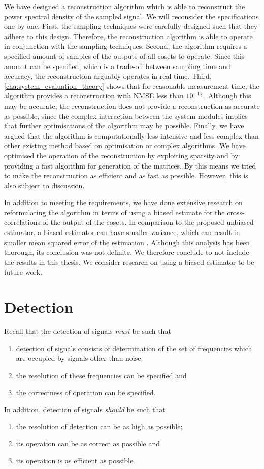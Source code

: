 \documentclass[a4paper, openany, oneside]{memoir}
\begin{document}
We have designed a reconstruction algorithm which is able to reconstruct the power spectral density of the sampled signal. We will reconsider the specifications one by one. First, the sampling techniques were carefully designed such that they adhere to this design. Therefore, the reconstruction algorithm is able to operate in conjunction with the sampling techniques. Second, the algorithm requires a specified amount of samples of the outputs of all cosets to operate. Since this amount can be specified, which is a trade-off between sampling time and accuracy, the reconstruction arguably operates in real-time. Third, \cref{cha:system_evaluation_theory} shows that for reasonable measurement time, the algorithm provides a reconstruction with NMSE less than $10^{-1.5}$. Although this may be accurate, the reconstruction does not provide a reconstruction as accurate as possible, since the complex interaction between the system modules implies that further optimisations of the algorithm may be possible. Finally, we have argued that the algorithm is computationally less intensive and less complex than other existing method based on optimisation or complex algorithms. We have optimised the operation of the reconstruction by exploiting sparsity and by providing a fast algorithm for generation of the matrices. By this means we tried to make the reconstruction as efficient and as fast as possible. However, this is also subject to discussion.

In addition to meeting the requirements, we have done extensive research on reformulating the algorithm in terms of using a biased estimate for the cross-correlations of the output of the cosets. In comparison to the proposed unbiased estimator, a biased estimator can have smaller variance, which can result in smaller mean squared error of the estimation \cite{hayes1996statistical}. Although this analysis has been thorough, its conclusion was not definite. We therefore conclude to not include the results in this thesis. We consider research on using a biased estimator to be future work.

\section{Detection}
Recall that the detection of signals \emph{must} be such that
\begin{enumerate}
    \item detection of signals consists of determination of the set of frequencies which are occupied by signals other than noise;
    \item the resolution of these frequencies can be specified and
    \item the correctness of operation can be specified.
\end{enumerate}
In addition, detection of signals \emph{should} be such that
\begin{enumerate}
    \item the resolution of detection can be as high as possible;
    \item its operation can be as correct as possible and
    \item its operation is as efficient as possible.
\end{enumerate}
\end{document}
